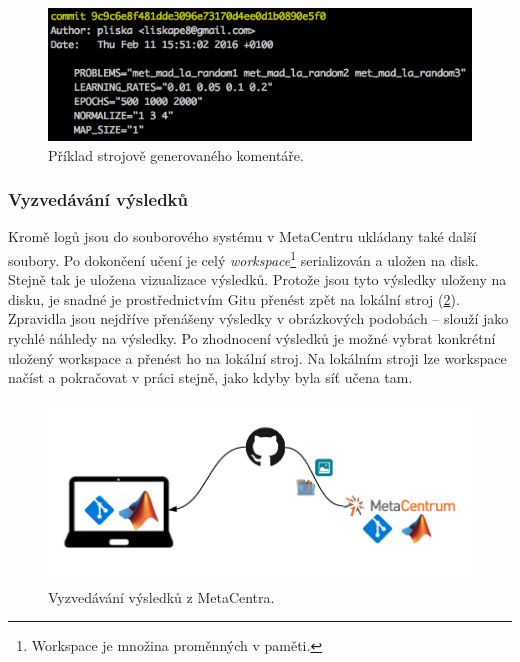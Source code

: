 \documentclass[thesis=M,czech]{FITthesis}[2012/06/26]
\begin{document}
\begin{figure}[htbp]
\begin{center}
	\includegraphics[scale=0.7]{semantic_commit}
\caption{Příklad strojově generovaného komentáře.}
\label{fig:semantic_commit}
\end{center}
\end{figure}



\subsubsection*{Vyzvedávání výsledků}
Kromě logů jsou do souborového systému v MetaCentru ukládany také další soubory. Po dokončení učení je celý \textit{workspace}\footnote{Workspace je množina proměnných v paměti.} serializován a uložen na disk. Stejně tak je uložena vizualizace výsledků. Protože jsou tyto výsledky uloženy na disku, je snadné je prostřednictvím Gitu přenést zpět na lokální stroj (\ref{fig:down}). Zpravidla jsou nejdříve přenášeny výsledky v obrázkových podobách -- slouží jako rychlé náhledy na výsledky. Po zhodnocení výsledků je možné vybrat konkrétní uložený workspace a přenést ho na lokální stroj. Na lokálním stroji lze workspace načíst a pokračovat v práci stejně, jako kdyby byla síť učena tam.

\begin{figure}[htbp]
\begin{center}
	\includegraphics[scale=0.9]{down.png}
\caption{Vyzvedávání výsledků z MetaCentra.}
\label{fig:down}
\end{center}
\end{figure}
\end{document}

